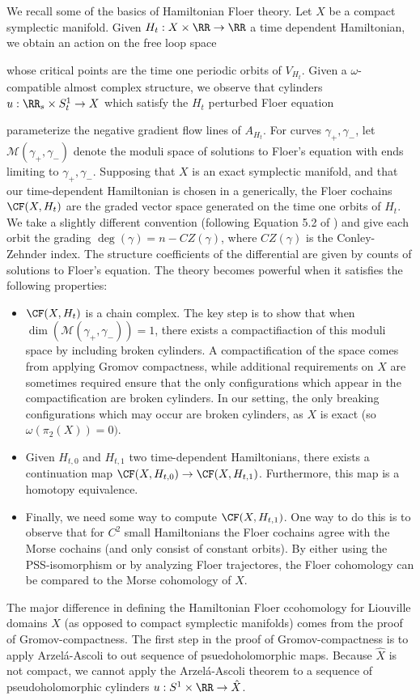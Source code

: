 We recall some of the basics of Hamiltonian Floer theory. Let $X$ be a compact symplectic manifold. 
Given $H_t: X\times \RR\to \RR$ a time dependent Hamiltonian, we obtain an action on the free loop space

whose critical points are the time one periodic orbits of $V_{H_t}$. Given a $\omega$-compatible almost complex structure, we observe that cylinders $u: \RR_s\times S^1_t\to X$ which satisfy the $H_t$ perturbed Floer equation

parameterize the negative gradient flow lines of $A_{H_t}$. For curves $\gamma_+, \gamma_-$, let $\mathcal M(\gamma_+, \gamma_-)$ denote the moduli space of solutions to Floer's equation with ends limiting to $\gamma_+, \gamma_-$.
Supposing that $X$ is an exact symplectic manifold, and that our time-dependent Hamiltonian is chosen in a generically, the Floer cochains $\CF(X, H_t)$ are the graded vector space generated  on the time one orbits of $H_t$.
We take a slightly different convention (following Equation 5.2 of \cite{abouzaid2010geometric}) and give each orbit the grading $\deg(\gamma)=n-CZ(\gamma)$, where $CZ(\gamma)$ is the Conley-Zehnder index.
The structure coefficients of the differential are given by counts of solutions to Floer's equation. The theory becomes powerful when it satisfies the following properties:
\begin{itemize}
    \item $\CF(X, H_t)$ is a chain complex. The key step is to show that when $\dim(\mathcal M(\gamma_+, \gamma_-))=1$, there exists a compactifiaction of this moduli space by including broken cylinders. A compactification of the space comes from applying Gromov compactness, while additional requirements on $X$ are sometimes required ensure that the only configurations which appear in the compactification are broken cylinders. In our setting, the only breaking configurations which may occur are broken cylinders, as $X$ is exact (so $\omega(\pi_2(X))=0)$.
    \item Given $H_{t, 0}$ and $H_{t, 1}$ two time-dependent Hamiltonians, there exists a continuation map $\CF(X, H_{t, 0})\to \CF(X, H_{t, 1})$. Furthermore, this map is a homotopy equivalence. 
    \item Finally, we need some way to compute $\CF(X, H_{t, 1})$. One way to do this is to observe that for $C^2$ small Hamiltonians the Floer cochains agree with the Morse cochains (and only consist of constant orbits). By either using the PSS-isomorphism or by analyzing Floer trajectores, the Floer cohomology can be compared to the Morse cohomology of $X$.
\end{itemize}
The major difference in defining the Hamiltonian Floer ccohomology for Liouville domains $X$ (as opposed to compact symplectic manifolds) comes from the proof of Gromov-compactness. The first step in the proof of Gromov-compactness is to apply Arzel\'a-Ascoli to out sequence of psuedoholomorphic maps.  Because $\hat X$ is not compact, we cannot apply the Arzel\'a-Ascoli theorem to a sequence of pseudoholomorphic cylinders $u: S^1\times \RR \to \hat X$. 

